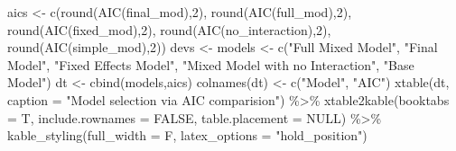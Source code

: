 \documentclass[12pt]{article}
\newenvironment{Shaded}{\begin{snugshade}}{\end{snugshade}}
\newcommand{\AttributeTok}[1]{\textcolor[rgb]{0.77,0.63,0.00}{#1}}
\newcommand{\ConstantTok}[1]{\textcolor[rgb]{0.00,0.00,0.00}{#1}}
\newcommand{\DecValTok}[1]{\textcolor[rgb]{0.00,0.00,0.81}{#1}}
\newcommand{\FunctionTok}[1]{\textcolor[rgb]{0.00,0.00,0.00}{#1}}
\newcommand{\NormalTok}[1]{#1}
\newcommand{\OtherTok}[1]{\textcolor[rgb]{0.56,0.35,0.01}{#1}}
\newcommand{\SpecialCharTok}[1]{\textcolor[rgb]{0.00,0.00,0.00}{#1}}
\newcommand{\StringTok}[1]{\textcolor[rgb]{0.31,0.60,0.02}{#1}}
\begin{document}
\begin{Shaded}
\begin{Highlighting}[]
\NormalTok{aics }\OtherTok{\textless{}{-}} \FunctionTok{c}\NormalTok{(}\FunctionTok{round}\NormalTok{(}\FunctionTok{AIC}\NormalTok{(final\_mod),}\DecValTok{2}\NormalTok{), }\FunctionTok{round}\NormalTok{(}\FunctionTok{AIC}\NormalTok{(full\_mod),}\DecValTok{2}\NormalTok{), }\FunctionTok{round}\NormalTok{(}\FunctionTok{AIC}\NormalTok{(fixed\_mod),}\DecValTok{2}\NormalTok{), }\FunctionTok{round}\NormalTok{(}\FunctionTok{AIC}\NormalTok{(no\_interaction),}\DecValTok{2}\NormalTok{), }\FunctionTok{round}\NormalTok{(}\FunctionTok{AIC}\NormalTok{(simple\_mod),}\DecValTok{2}\NormalTok{))}
\NormalTok{devs }\OtherTok{\textless{}{-}} 
\NormalTok{models }\OtherTok{\textless{}{-}} \FunctionTok{c}\NormalTok{(}\StringTok{"Full Mixed Model"}\NormalTok{, }\StringTok{"Final Model"}\NormalTok{,}
            \StringTok{"Fixed Effects Model"}\NormalTok{, }\StringTok{"Mixed Model with no Interaction"}\NormalTok{, }\StringTok{"Base Model"}\NormalTok{)}
\NormalTok{dt }\OtherTok{\textless{}{-}} \FunctionTok{cbind}\NormalTok{(models,aics)}
\FunctionTok{colnames}\NormalTok{(dt) }\OtherTok{\textless{}{-}} \FunctionTok{c}\NormalTok{(}\StringTok{"Model"}\NormalTok{, }\StringTok{"AIC"}\NormalTok{)}
\FunctionTok{xtable}\NormalTok{(dt, }\AttributeTok{caption =} \StringTok{"Model selection via AIC comparision"}\NormalTok{) }\SpecialCharTok{\%\textgreater{}\%}
  \FunctionTok{xtable2kable}\NormalTok{(}\AttributeTok{booktabs =}\NormalTok{ T, }\AttributeTok{include.rownames =} \ConstantTok{FALSE}\NormalTok{, }\AttributeTok{table.placement =} \ConstantTok{NULL}\NormalTok{) }\SpecialCharTok{\%\textgreater{}\%}
  \FunctionTok{kable\_styling}\NormalTok{(}\AttributeTok{full\_width =}\NormalTok{ F, }\AttributeTok{latex\_options =} \StringTok{"hold\_position"}\NormalTok{) }
\end{Highlighting}
\end{Shaded}




\end{document}
